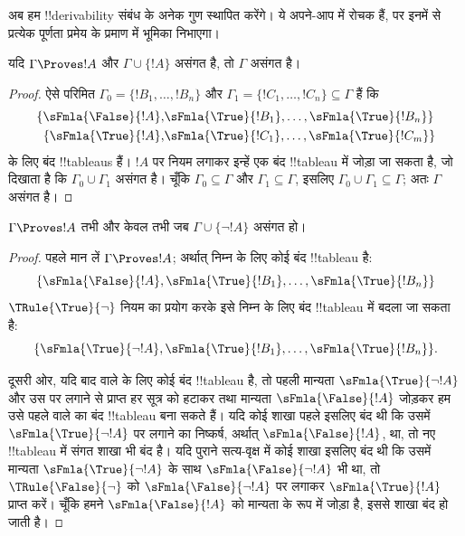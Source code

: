 \documentclass[../../../include/open-logic-section]{subfiles}
\begin{document}
      {}
      {}


अब हम !!{derivability} संबंध के अनेक गुण स्थापित करेंगे। ये अपने-आप में
रोचक हैं, पर इनमें से प्रत्येक पूर्णता प्रमेय के प्रमाण में भूमिका निभाएगा।

\begin{prop}
  यदि $\Gamma \Proves !A$ और $\Gamma \cup \{!A\}$ असंगत है, तो
  $\Gamma$ असंगत है।
\end{prop}

\begin{proof}
ऐसे परिमित $\Gamma_0 = \{!B_1, \dots, !B_n\}$ और $\Gamma_1
  =\{!C_1, \dots, !C_n\} \subseteq \Gamma$ हैं कि
  \begin{align*}
    \{\sFmla{\False}{!A}, &
    \sFmla{\True}{!B_1}, \dots, \sFmla{\True}{!B_n}\} \\
    \{\sFmla{\True}{!A}, &
    \sFmla{\True}{!C_1}, \dots, \sFmla{\True}{!C_m}\}
  \end{align*}
  के लिए बंद !!{tableau}s हैं। $!A$ पर \Cut{} नियम लगाकर इन्हें एक बंद
  !!{tableau} में जोड़ा जा सकता है, जो दिखाता है कि $\Gamma_0
  \cup \Gamma_1$ असंगत है। चूँकि $\Gamma_0
  \subseteq \Gamma$ और $\Gamma_1 \subseteq \Gamma$, इसलिए $\Gamma_0 \cup
  \Gamma_1 \subseteq \Gamma$;
  अतः $\Gamma$ असंगत है।
\end{proof}

\begin{prop}
$\Gamma \Proves !A$ तभी और केवल तभी जब $\Gamma \cup \{\lnot !A\}$ असंगत हो।
\end{prop}

\begin{proof}
पहले मान लें $\Gamma \Proves !A$; अर्थात् निम्न के लिए कोई बंद
!!{tableau} है:
\[
\{\sFmla{\False}{!A},
\sFmla{\True}{!B_1}, \dots, \sFmla{\True}{!B_n}\}
\]
$\TRule{\True}{\lnot}$ नियम का प्रयोग करके इसे निम्न के लिए बंद
!!{tableau} में बदला जा सकता है:
\[
\{\sFmla{\True}{\lnot !A},
\sFmla{\True}{!B_1}, \dots, \sFmla{\True}{!B_n}\}.
\]

दूसरी ओर, यदि बाद वाले के लिए कोई बंद !!{tableau} है, तो पहली मान्यता
$\sFmla{\True}{\lnot !A}$ और उस पर \TRule{\True}{\lnot} लगाने से प्राप्त
हर सूत्र को हटाकर तथा मान्यता $\sFmla{\False}{!A}$ जोड़कर हम उसे पहले वाले
का बंद !!{tableau} बना सकते हैं। यदि कोई शाखा पहले इसलिए बंद थी कि उसमें
$\sFmla{\True}{\lnot !A}$ पर \TRule{\True}{\lnot} लगाने का निष्कर्ष,
अर्थात् $\sFmla{\False}{!A}$, था, तो नए !!{tableau} में संगत शाखा भी बंद
है। यदि पुराने सत्य-वृक्ष में कोई शाखा इसलिए बंद थी कि उसमें मान्यता
$\sFmla{\True}{\lnot !A}$ के साथ $\sFmla{\False}{\lnot
  !A}$ भी था, तो $\TRule{\False}{\lnot}$ को
$\sFmla{\False}{\lnot !A}$ पर लगाकर
$\sFmla{\True}{!A}$ प्राप्त करें। चूँकि हमने
$\sFmla{\False}{!A}$ को मान्यता के रूप में जोड़ा है, इससे शाखा बंद हो जाती
है।
\end{proof}
\end{document}
